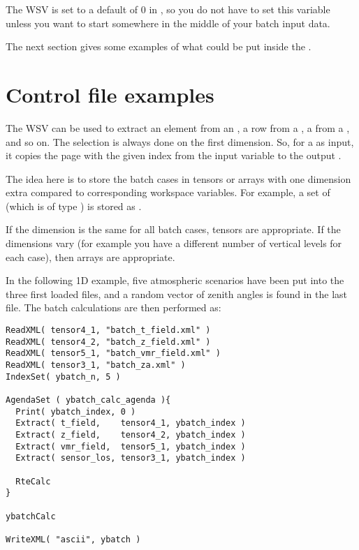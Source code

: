 The WSV  is set to a default of 0 in
, so you do not have to set this variable
unless you want to start somewhere in the middle of your batch input
data. 

The next section gives some examples of what could be put inside
the .

\section{Control file examples}
%
The WSV  can be used to extract an element from an
, a row from a , a
 from a , and so on. The
selection is always done on the first dimension. So, for a
 as input, it copies the page with the given index
from the input  variable to the output
.

The idea here is to store the batch cases in tensors or arrays with
one dimension extra compared to corresponding workspace variables. For
example, a set of  (which is of type
) is stored as .

If the dimension is the same for all batch cases, tensors are
appropriate. If the dimensions vary (for example you have a different
number of vertical levels for each case), then arrays are appropriate.

In the following 1D example, five atmospheric scenarios
have been put into the three first loaded files, and a random vector
of zenith angles is found in the last file. The batch calculations
are then performed as:

\begin{verbatim}
ReadXML( tensor4_1, "batch_t_field.xml" )
ReadXML( tensor4_2, "batch_z_field.xml" )
ReadXML( tensor5_1, "batch_vmr_field.xml" )
ReadXML( tensor3_1, "batch_za.xml" )
IndexSet( ybatch_n, 5 )

AgendaSet ( ybatch_calc_agenda ){
  Print( ybatch_index, 0 )
  Extract( t_field,    tensor4_1, ybatch_index )
  Extract( z_field,    tensor4_2, ybatch_index )
  Extract( vmr_field,  tensor5_1, ybatch_index )
  Extract( sensor_los, tensor3_1, ybatch_index )

  RteCalc
}

ybatchCalc

WriteXML( "ascii", ybatch )
\end{verbatim}

